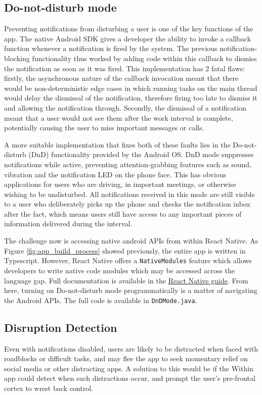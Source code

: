\subsection{Do-not-disturb mode}
Preventing notifications from disturbing a user is one of the key functions of the app. The native Android SDK gives a developer the ability to invoke a callback function whenever a notification is fired by the system. The previous notification-blocking functionality thus worked by adding code within this callback to dismiss the notification as soon as it was fired. This implementation has 2 fatal flaws: firstly, the asynchronous nature of the callback invocation meant that there would be non-deterministic edge cases in which running tasks on the main thread would delay the dismissal of the notification, therefore firing too late to dismiss it and allowing the notification through. Secondly, the dismissal of a notification meant that a user would not see them after the work interval is complete, potentially causing the user to miss important messages or calls.

A more suitable implementation that fixes both of these faults lies in the Do-not-disturb (DnD) functionality provided by the Android OS. DnD mode suppresses notifications while active, preventing attention-grabbing features such as sound, vibration and the notification LED on the phone face. This has obvious applications for users who are driving, in important meetings, or otherwise wishing to be undisturbed. All notifications received in this mode are still visible to a user who deliberately picks up the phone and checks the notification inbox after the fact, which means users still have access to any important pieces of information delivered during the interval.

The challenge now is accessing native android APIs from within React Native. As Figure \ref{fig:app_build_process} showed previously, the entire app is written in Typescript. However, React Native offers a \texttt{NativeModules} feature which allows developers to write native code modules which may be accessed across the language gap. Full documentation is available in the \href{https://reactnative.dev/docs/native-modules-intro}{React Native guide}. From here, turning on Do-not-disturb mode programmatically is a matter of navigating the Android APIs. The full code is available in \texttt{DnDMode.java}.


\subsection{Disruption Detection}
Even with notifications disabled, users are likely to be distracted when faced with roadblocks or difficult tasks, and may flee the app to seek momentary relief on social media or other distracting apps. A solution to this would be if the Within app could detect when such distractions occur, and prompt the user's pre-frontal cortex to wrest back control.

